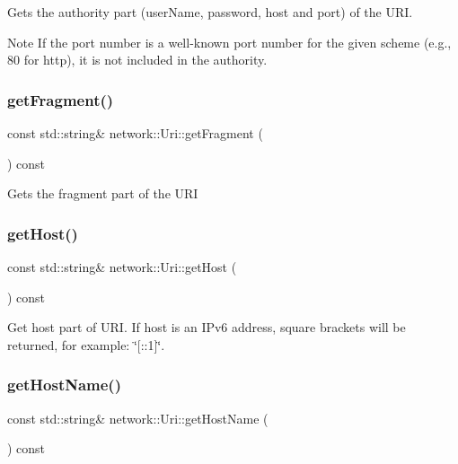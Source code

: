 Gets the authority part (user\+Name, password, host and port) of the U\+RI. \begin{DoxyNote}{Note}
If the port number is a well-\/known port number for the given scheme (e.\+g., 80 for http), it is not included in the authority. 
\end{DoxyNote}
\mbox{\label{classnetwork_1_1Uri_a4d84c0af6027ee822b5b1d1473d152c7}} 
\subsubsection{\texorpdfstring{get\+Fragment()}{getFragment()}}
{\footnotesize\ttfamily const std\+::string\& network\+::\+Uri\+::get\+Fragment (\begin{DoxyParamCaption}{ }\end{DoxyParamCaption}) const\hspace{0.3cm}{\ttfamily [inline]}}

Gets the fragment part of the U\+RI \mbox{\label{classnetwork_1_1Uri_a993f91088a1d761721398970c206068d}} 
\subsubsection{\texorpdfstring{get\+Host()}{getHost()}}
{\footnotesize\ttfamily const std\+::string\& network\+::\+Uri\+::get\+Host (\begin{DoxyParamCaption}{ }\end{DoxyParamCaption}) const\hspace{0.3cm}{\ttfamily [inline]}}

Get host part of U\+RI. If host is an I\+Pv6 address, square brackets will be returned, for example\+: \char`\"{}\mbox{[}\+::1\mbox{]}\char`\"{}. \mbox{\label{classnetwork_1_1Uri_a3d73311f4e6ff76f0b87854e8b2f7113}} 
\subsubsection{\texorpdfstring{get\+Host\+Name()}{getHostName()}}
{\footnotesize\ttfamily const std\+::string\& network\+::\+Uri\+::get\+Host\+Name (\begin{DoxyParamCaption}{ }\end{DoxyParamCaption}) const\hspace{0.3cm}{\ttfamily [inline]}}

